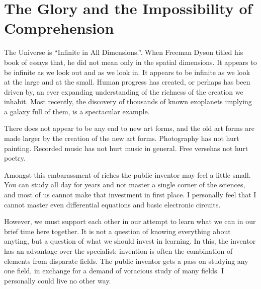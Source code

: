 \documentclass[
	fontsize=10pt, %
	twoside=false, %
	secnumdepth=1, %
]{kaobook}
\begin{document}
\section{The Glory and the Impossibility of Comprehension}

The Universe is ``Infinite in All Dimensions.''\cite{Dyson1989}.
When Freeman Dyson titled his book of essays that, he did not mean
only in the spatial dimensions.
It appears to be infinite as we look out and as we look in.
It appears to be infinite as we look at the large and at the small.
Human progress has created, or perhaps has been driven by,
an ever expanding understanding of the richness of the creation
we inhabit. Most recently, the discovery of thousands of known
exoplanets implying a galaxy full of them, is a spectacular example.

There does not appear to be any end to new art forms, and the
old art forms are made larger by the creation of the new art forms.
Photography has not hurt painting.
Recorded music has not hurt music in general.
Free versehas not hurt poetry.

Amongst this embarassment of riches the public inventor
may feel a little small.
You can study all day for years and not master a single corner
of the sciences, and most of us cannot make that investment in
first place.
I personally feel that I cannot master even differential equations
and basic electronic circuits.

However, we must support each other in our attempt to learn what we can
in our brief time here together. It is not a question of knowing everything
about anyting, but a question of what we should invest in learning.
In this, the inventor has an advantage over the specialist:
invention is often the combination of elements from disparate fields.
The public inventor gets a pass on studying any one field,
in exchange for a demand of voracious study of many fields.
I personally could live no other way.
\end{document}

